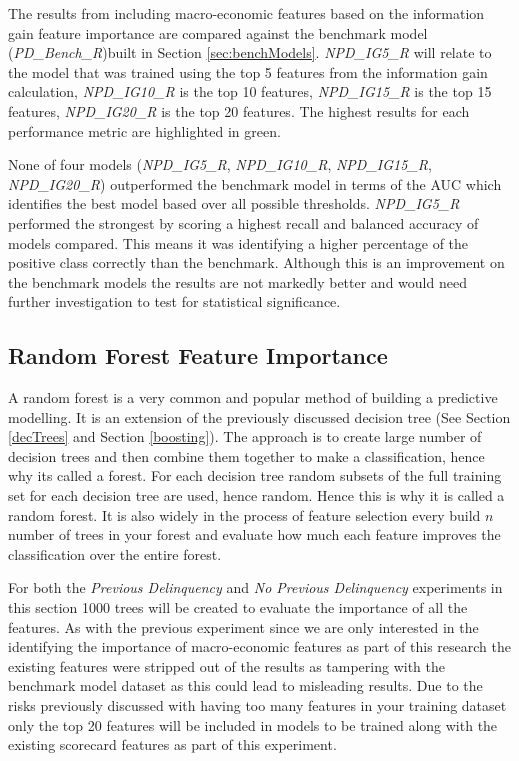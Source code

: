 The results from including macro-economic features based on the information gain feature importance are compared against the benchmark model (\textit{PD\_Bench\_R})built in Section \ref{sec:benchModels}. \textit{NPD\_IG5\_R} will relate to the model that was trained using the top 5 features from the information gain calculation, \textit{NPD\_IG10\_R} is the top 10 features, \textit{NPD\_IG15\_R} is the top 15 features, \textit{NPD\_IG20\_R} is the top 20 features. The highest results for each performance metric are highlighted in green.

None of four models (\textit{NPD\_IG5\_R}, \textit{NPD\_IG10\_R}, \textit{NPD\_IG15\_R}, \textit{NPD\_IG20\_R}) outperformed the benchmark model in terms of the AUC which identifies the best model based over all possible thresholds. \textit{NPD\_IG5\_R} performed the strongest by scoring a highest recall and balanced accuracy of models compared. This means it was identifying a higher percentage of the positive class correctly than the benchmark. Although this is an improvement on the benchmark models the results are not markedly better and would need further investigation to test for statistical significance.

\subsection{Random Forest Feature Importance}
A random forest is a very common and popular method of building a predictive modelling. It is an extension of the previously discussed decision tree (See Section \ref{decTrees} and Section \ref{boosting}). The approach is to create large number of decision trees and then combine them together to make a classification, hence why its called a forest. For each decision tree random subsets of the full training set for each decision tree are used, hence random. Hence this is why it is called a random forest. It is also widely in the process of feature selection every build $n$ number of trees in your forest and evaluate how much each feature improves the classification over the entire forest. 

For both the \textit{Previous Delinquency} and \textit{No Previous Delinquency} experiments in this section 1000 trees will be created to evaluate the importance of all the features. As with the previous experiment since we are only
interested in the identifying the importance of macro-economic features as part of this
research the existing features were stripped out of the results as tampering with the benchmark model dataset as this could lead to misleading results. Due to the risks previously discussed
with having too many features in your training dataset only the top 20 features will be
included in models to be trained along with the existing scorecard features as part of this experiment.


